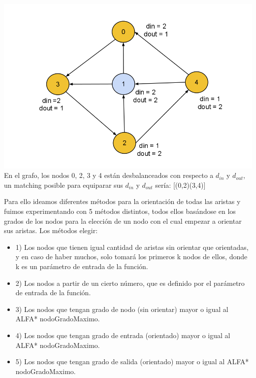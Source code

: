 \documentclass[11pt, a4paper, spanish]{article}
\begin{document}
\begin{center}
\centering \includegraphics[scale=0.30]{img/Matching2.png}\\
\small{En el grafo, los nodos 0, 2, 3 y 4 est\'an desbalanceados con respecto a $d_{in}$ y $d_{out}$, un matching posible para equiparar sus $d_{in}$ y $d_{out}$ ser\'ia: [(0,2)(3,4)]}
\end{center}

	Para ello ideamos diferentes m\'etodos para la orientaci\'on de todas las aristas y fuimos experimentando con 5 m\'etodos distintos, todos ellos bas\'andose en los grados de los nodos para la elecci\'on de un nodo con el cual empezar a orientar sus aristas. Los m\'etodos elegir:\\
	
  \begin{itemize}
	\item 1) Los nodos que tienen igual cantidad de aristas sin orientar que orientadas, y en caso de haber muchos, solo tomar\'a los primeros k nodos de ellos, donde k es un par\'ametro de entrada de la funci\'on.
	\item 2) Los nodos a partir de un cierto n\'umero, que es definido por el par\'ametro de entrada de la funci\'on.
	\item 3) Los nodos que tengan grado de nodo (sin orientar) mayor o igual al ALFA* nodoGradoMaximo.
	\item 4) Los nodos que tengan grado de entrada (orientado) mayor o igual al ALFA* nodoGradoMaximo.
	\item 5) Los nodos que tengan grado de salida (orientado) mayor o igual al ALFA* nodoGradoMaximo.
  \end{itemize}
\end{document}
